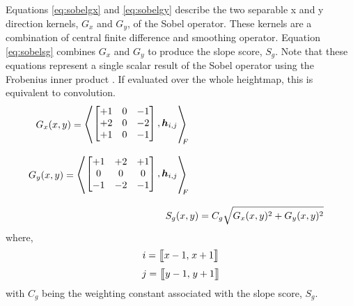         Equations \ref{eq:sobelgx} and \ref{eq:sobelgy} describe the two separable x and y direction kernels, \(G_x\) and \(G_y\),
        of the Sobel operator. These kernels are a combination of central finite difference and smoothing operator. Equation \ref{eq:sobelsg} combines \(G_x\) and \(G_y\) to produce the slope score, \(S_g\). Note that these equations represent
        a single scalar result of the Sobel operator using the Frobenius inner product \citep{horn2012matrix}. If evaluated over the whole heightmap, this is equivalent
        to convolution.
        \begin{align}
            \begin{split} \label{eq:sobelgx}
                G_x(x,y) &= 
                        \sbox0{$
                        \begin{bmatrix}
                            +1 & 0 & -1\\
                            +2 & 0 & -2\\
                            +1 & 0 & -1
                        \end{bmatrix}
                        ,\boldsymbol{h}_{i,j}
                        $}
                        \mathopen{\resizebox{1.2\width}{1.1\ht0}{$\Bigg\langle$}}
                        \raisebox{0.08\ht0}{\usebox{0}}
                        \mathclose{\resizebox{1.2\width}{1.1\ht0}{$\Bigg\rangle$}}_{\mkern-10mu F}
            \end{split}\\[0.3cm]
            \begin{split} \label{eq:sobelgy}
                G_y(x,y) &= 
                        \sbox0{$
                        \begin{bmatrix}
                            +1 & +2 & +1\\
                            0 & 0 & 0\\
                            -1 & -2 & -1
                        \end{bmatrix}
                        ,\boldsymbol{h}_{i,j}
                        $}
                        \mathopen{\resizebox{1.2\width}{1.1\ht0}{$\Bigg\langle$}}
                        \raisebox{0.08\ht0}{\usebox{0}}
                        \mathclose{\resizebox{1.2\width}{1.1\ht0}{$\Bigg\rangle$}}_{\mkern-10mu F}
            \end{split}\\[0.3cm]
            S_g(x,y) &= C_g\sqrt{G_x(x,y)^2 + G_y(x,y)^2} \label{eq:sobelsg}
        \end{align}
        where,
        \[i = \big[\mkern-4.7mu\big[x-1,\mkern2mu x+1\big]\mkern-4.7mu\big]\]
        \[j = \big[\mkern-4.7mu\big[y-1,\mkern2mu y+1\big]\mkern-4.7mu\big]\]
        \noindent
        with \(C_g\) being the weighting constant associated with the slope score, \(S_g\).
        
